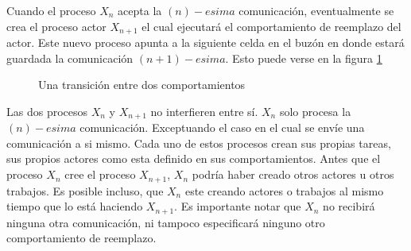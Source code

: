 Cuando el proceso $X_n$ acepta la $(n)-esima$ comunicación, eventualmente se crea el proceso actor $X_{n+1}$ el cual ejecutará el comportamiento de reemplazo del actor. Este nuevo proceso apunta a la siguiente celda en el buzón en donde estará guardada la comunicación $(n+1)-esima$. Esto puede verse en la figura \ref{fig:actortransition}

\begin{figure}[H]
\caption{Una transición entre dos comportamientos}
\label{fig:actortransition}
\end{figure}

Las dos procesos $X_n$ y $X_{n+1}$ no interfieren entre sí. $X_n$ solo procesa la $(n)-esima$ comunicación. Exceptuando el caso en el cual se envíe una comunicación a si mismo. Cada uno de estos procesos crean sus propias tareas, sus propios actores como esta definido en sus comportamientos. Antes que el proceso $X_n$ cree el proceso $X_{n+1}$, $X_n$ podría haber creado otros actores u otros trabajos. Es posible incluso, que $X_n$ este creando actores o trabajos al mismo tiempo que lo está haciendo $X_{n+1}$. Es importante notar que $X_n$ no recibirá ninguna otra comunicación, ni tampoco especificará ninguno otro comportamiento de reemplazo.

